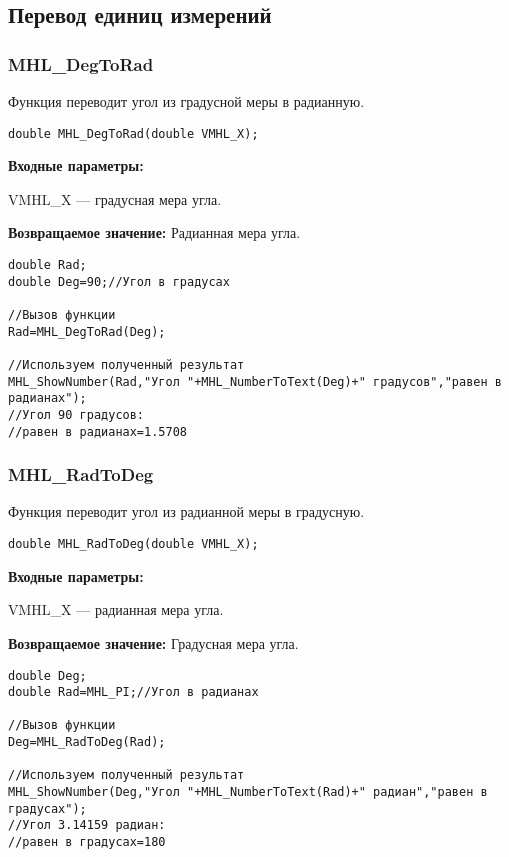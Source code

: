 \documentclass[a4paper,12pt]{article}
\begin{document}
\subsection{Перевод единиц измерений}

\subsubsection{MHL\_DegToRad}\label{MHL_DegToRad}

Функция переводит угол из градусной меры в радианную.


\begin{lstlisting}[label=code_syntax_MHL_DegToRad,caption=Синтаксис]
double MHL_DegToRad(double VMHL_X);
\end{lstlisting}

\textbf{Входные параметры:}

 VMHL\_X --- градусная мера угла.

\textbf{Возвращаемое значение:}
Радианная мера угла.


\begin{lstlisting}[label=code_use_MHL_DegToRad,caption=Пример использования]
double Rad;
double Deg=90;//Угол в градусах

//Вызов функции
Rad=MHL_DegToRad(Deg);

//Используем полученный результат
MHL_ShowNumber(Rad,"Угол "+MHL_NumberToText(Deg)+" градусов","равен в радианах");
//Угол 90 градусов:
//равен в радианах=1.5708
\end{lstlisting}

\subsubsection{MHL\_RadToDeg}\label{MHL_RadToDeg}

Функция переводит угол из радианной меры в градусную.


\begin{lstlisting}[label=code_syntax_MHL_RadToDeg,caption=Синтаксис]
double MHL_RadToDeg(double VMHL_X);
\end{lstlisting}

\textbf{Входные параметры:}

 VMHL\_X --- радианная мера угла.

\textbf{Возвращаемое значение:}
Градусная мера угла.


\begin{lstlisting}[label=code_use_MHL_RadToDeg,caption=Пример использования]
double Deg;
double Rad=MHL_PI;//Угол в радианах

//Вызов функции
Deg=MHL_RadToDeg(Rad);

//Используем полученный результат
MHL_ShowNumber(Deg,"Угол "+MHL_NumberToText(Rad)+" радиан","равен в градусах");
//Угол 3.14159 радиан:
//равен в градусах=180
\end{lstlisting}
\end{document}
